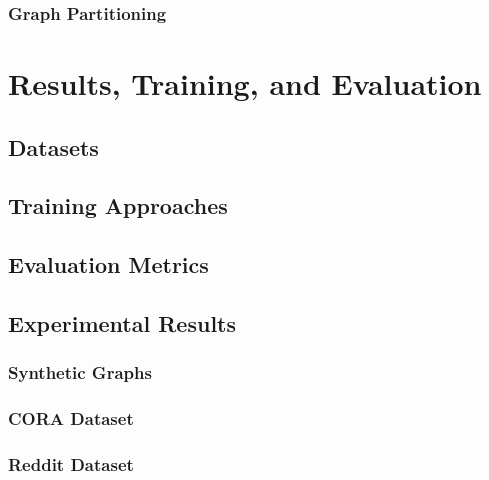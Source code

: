 \documentclass{article}
\begin{document}
\subsubsection{Graph Partitioning}




\section{Results, Training, and Evaluation}

\subsection{Datasets}

\subsection{Training Approaches}

\subsection{Evaluation Metrics}

\subsection{Experimental Results}
\subsubsection{Synthetic Graphs}

\subsubsection{CORA Dataset}

\subsubsection{Reddit Dataset}



\end{document}
